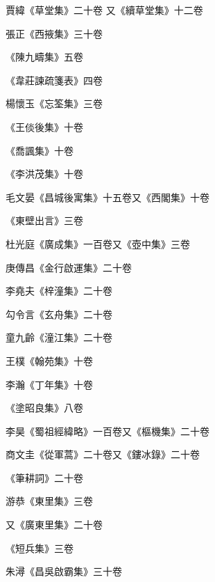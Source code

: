 \begin{pinyinscope}
 賈緯《草堂集》二十卷
 又《續草堂集》十二卷



 張正《西掖集》三十卷



 《陳九疇集》五卷



 《韋莊諫疏箋表》四卷



 楊懷玉《忘筌集》三卷



 《王倓後集》十卷



 《喬諷集》十卷



 《李洪茂集》十卷



 毛文晏《昌城後寓集》十五卷又《西閣集》十卷



 《東壁出言》三卷



 杜光庭《廣成集》一百卷又《壺中集》三卷



 庚傳昌《金行啟運集》二十卷



 李堯夫《梓潼集》二十卷



 勾令言《玄舟集》二十卷



 童九齡《潼江集》二十卷



 王樸《翰苑集》十卷



 李瀚《丁年集》十卷



 《塗昭良集》八卷



 李昊《蜀祖經緯略》一百卷又《樞機集》二十卷



 商文圭《從軍蒿》二十卷又《鏤冰錄》二十卷



 《筆耕詞》二十卷



 游恭《東里集》三卷



 又《廣東里集》二十卷



 《短兵集》三卷



 朱潯《昌吳啟霸集》三十卷




\end{pinyinscope}
